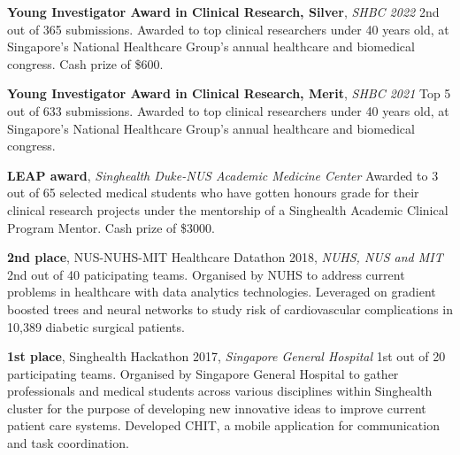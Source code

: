 \documentclass[letterpaper,10pt,oneside]{article}
\begin{document}
\begin{body}
\textbf{Young Investigator Award in Clinical Research, Silver}, \textit{SHBC 2022}
\hfill{}
\GapNoBreak
\BulletItem
2nd out of 365 submissions. Awarded to top clinical researchers under 40 years old, at Singapore's National Healthcare Group's annual healthcare and biomedical congress. Cash prize of \$600.
\GapNoBreak
\medskip

\textbf{Young Investigator Award in Clinical Research, Merit}, \textit{SHBC 2021}
\hfill{}
\GapNoBreak
\BulletItem
Top 5 out of 633 submissions. Awarded to top clinical researchers under 40 years old, at Singapore's National Healthcare Group's annual healthcare and biomedical congress. 
\GapNoBreak
\medskip

\textbf{LEAP award}, \textit{Singhealth Duke-NUS Academic Medicine Center}
\hfill{}
\GapNoBreak
\BulletItem
Awarded to 3 out of 65 selected medical students who have gotten honours grade for their clinical research projects under the mentorship of a Singhealth Academic Clinical Program Mentor. Cash prize of \$3000.
\GapNoBreak
\medskip

\textbf{2nd place}, \textcolor{mygray}{NUS-NUHS-MIT Healthcare Datathon 2018}, \textit{NUHS, NUS and MIT}
\hfill{}
\GapNoBreak
\BulletItem
2nd out of 40 paticipating teams. Organised by NUHS to address current problems in healthcare with data analytics technologies. Leveraged on gradient boosted trees and neural networks to study risk of cardiovascular complications in 10,389 diabetic surgical patients.
\GapNoBreak
\medskip



\textbf{1st place}, \textcolor{mygray}{Singhealth Hackathon 2017}, \textit{Singapore General Hospital}
\hfill{}
\BulletItem
1st out of 20 participating teams. Organised by Singapore General Hospital to gather professionals and medical students across various disciplines within Singhealth cluster for the purpose of developing new innovative ideas to improve current patient care systems. Developed CHIT, a mobile application for communication and task coordination.
\GapNoBreak
\medskip


\end{body}
\end{document}
